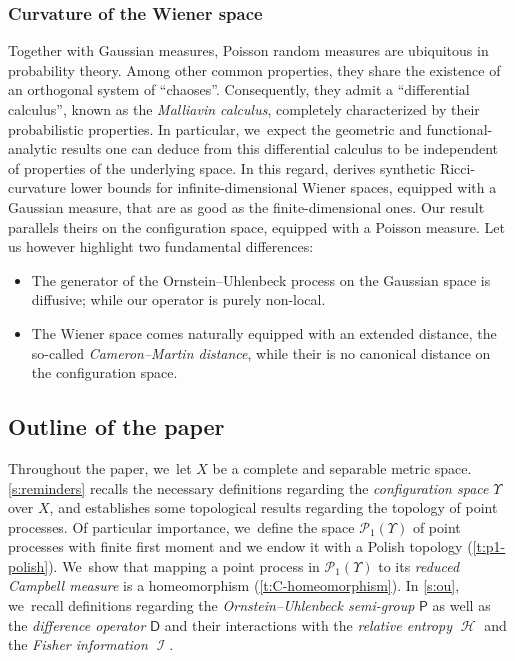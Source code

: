 \documentclass[10pt]{amsart}
\theoremstyle{definition}
\theoremstyle{remark}
\DeclareMathOperator{\ent}{\mathcal{H}}
\DeclareMathOperator{\fish}{\mathcal{I}}
\begin{document}
\subsubsection{Curvature of the Wiener space}
Together with Gaussian measures, Poisson random measures are ubiquitous in probability theory.
Among other common properties, they share the existence of an orthogonal system of \enquote{chaoses}.
Consequently, they admit a \enquote{differential calculus}, known as the \emph{Malliavin calculus}, completely characterized by their probabilistic properties.
In particular, we~expect the geometric and functional-analytic results one can deduce from this differential calculus to be independent of properties of the underlying space.
In this regard, \cite{FangShaoSturm} derives synthetic Ricci-curvature lower bounds for infinite-dimensional Wiener spaces, equipped with a Gaussian measure, that are as good as the finite-dimensional ones.
Our result parallels theirs on the configuration space, equipped with a Poisson measure.
Let us however highlight two fundamental differences:
\begin{itemize}[wide]
\item The generator of the Ornstein--Uhlenbeck process on the Gaussian space is diffusive; while our operator is purely non-local.
\item The Wiener space comes naturally equipped with an extended distance, the so-called \emph{Cameron--Martin distance}, while their is no canonical distance on the configuration space.
\end{itemize}

\subsection{Outline of the paper}
Throughout the paper, we~let $X$ be a complete and separable metric space.
\cref{s:reminders} recalls the necessary definitions regarding the \emph{configuration space} $\varUpsilon$ over $X$, and establishes some topological results regarding the topology of point processes.
Of particular importance, we~define the space $\mathscr{P}_{1}(\varUpsilon)$ of point processes with finite first moment and we endow it with a Polish topology (\cref{t:p1-polish}). We~show that mapping a point process in $\mathscr{P}_{1}(\varUpsilon)$ to its \emph{reduced Campbell measure} is a homeomorphism (\cref{t:C-homeomorphism}).
In \cref{s:ou}, we~recall definitions regard\-ing the \emph{Ornstein--Uhlenbeck semi-group} $\mathsf{P}$ as well as the \emph{difference operator} $\mathsf{D}$ and their interactions with the \emph{relative entropy $\ent$} and the \emph{Fisher information $\fish$}.
\end{document}
